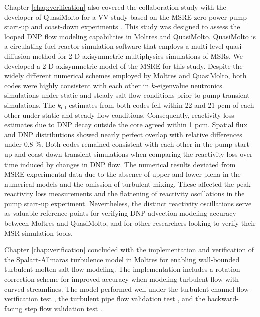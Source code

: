 Chapter \ref{chap:verification} also covered the collaboration study with the developer of
QuasiMolto \cite{reynolds_analysis_2023} for a \gls{VV} study based on the \gls{MSRE} zero-power
pump start-up and coast-down experiments \cite{prince_zero-power_1968}. This study was designed to
assess the looped \gls{DNP} flow modeling capabilities in Moltres and QuasiMolto. QuasiMolto is a
circulating fuel reactor simulation software that employs a multi-level quasi-diffusion method
\cite{tamang_multilevel_2014} for 2-D axisymmetric multiphysics simulations of \glspl{MSR}.
We developed a 2-D axisymmetric model of the \gls{MSRE} for this study. Despite the widely
different numerical schemes employed by Moltres and QuasiMolto, both codes were highly consistent
with each other in $k$-eigenvalue neutronics simulations under static and steady salt flow
conditions prior to pump transient simulations. The $k_\text{eff}$ estimates from both codes fell
within 22 and 21 pcm of each other under static and steady flow conditions. Consequently, reactivity
loss estimates due to \gls{DNP} decay outside the core agreed within 1 pcm. Spatial flux and
\gls{DNP} distributions showed nearly perfect overlap with relative differences under 0.8 \%. Both
codes remained consistent with each other in the pump start-up and coast-down transient simulations
when comparing the reactivity loss over time induced by changes in \gls{DNP} flow. The numerical
results deviated from \gls{MSRE} experimental data due to the absence of upper and lower plena in
the numerical models and the omission of turbulent mixing. These affected the peak reactivity loss
measurements and the flattening of reactivity oscillations in the pump start-up experiment.
Nevertheless, the distinct reactivity oscillations serve as valuable reference points for
verifying \gls{DNP} advection modeling accuracy between Moltres and QuasiMolto, and for other
researchers looking to verify their \gls{MSR} simulation tools.

Chapter \ref{chap:verification} concluded with the implementation and verification of the
Spalart-Allmaras turbulence model in Moltres for enabling wall-bounded turbulent molten salt flow
modeling. The implementation includes a rotation correction scheme
\cite{aupoix_extensions_2003, dacles-mariani_numericalexperimental_1995} for improved accuracy
when modeling turbulent flow with curved streamlines. The model performed well under the turbulent
channel flow verification test \cite{moser_direct_1999}, the turbulent pipe flow validation test
\cite{laufer_structure_1954}, and the backward-facing step flow validation test
\cite{driver_features_1985}.

